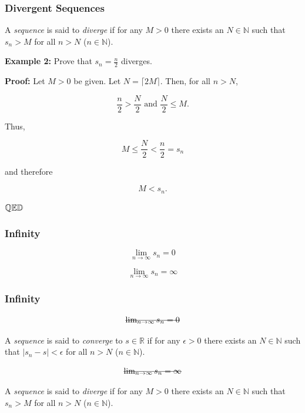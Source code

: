 \documentclass[10pt]{beamer}
\def\R{\mathbb{R}}                     %
\def\N{\mathbb{N}}                     %
\def\Q{\mathbb{Q}}                     %
\def\D{\mathbb{D}}                     %
\def\qed{ \hspace*{\fill} \Q \mathbb{E} \D}
\newcommand{\stkout}[1]{\ifmmode\text{\sout{\ensuremath{#1}}}\else\sout{#1}\fi}
\begin{document}
\begin{frame}
  \frametitle{Divergent Sequences}

  A \textit{sequence} is said to \textit{diverge} if for any $M > 0$ there exists an $N \in \N$ such that $s_n > M$ for all $n > N$ ($n \in \N$).
  \vspace{5mm}

  \textbf{Example 2:} Prove that $s_n = \frac{n}{2}$ diverges. \pause
  \vspace{5mm}

  \textbf{Proof:} Let $M > 0$ be given. \pause Let $N = \lceil 2M \rceil $. Then, for all $n > N$, \pause

  \[ \frac{n}{2} > \frac{N}{2} \text{ and } \frac{N}{2} \le M. \] \pause

  Thus,

  \[ M \le \frac{N}{2} < \frac{n}{2} = s_n \] \pause

  and therefore

  \[ M < s_n. \] \pause

  $\qed$

\end{frame}




\begin{frame}
  \frametitle{Infinity}

  \[ \lim_{n \to \infty} s_n = 0 \]

  \[ \lim_{n \to \infty} s_n = \infty \]

\end{frame}

\begin{frame}
  \frametitle{Infinity}


  \[ \stkout{ \lim_{n \to \infty} s_n = 0 } \]

  A \textit{sequence} is said to \textit{converge} to $s \in \R$ if for any $\epsilon > 0$ there exists an $N \in \N$ such that $\vert s_n - s \vert < \epsilon$ for all $n > N$ ($n \in \N$).

  \[ \stkout{ \lim_{n \to \infty} s_n = \infty } \]

  A \textit{sequence} is said to \textit{diverge} if for any $M > 0$ there exists an $N \in \N$ such that $s_n > M$ for all $n > N$ ($n \in \N$).


\end{frame}
\end{document}
